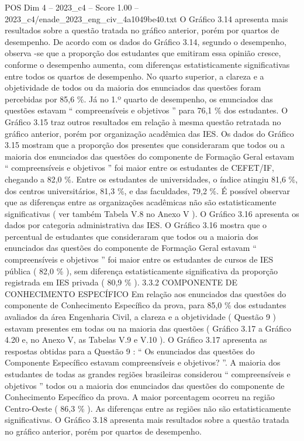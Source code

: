 \begin{textsample}{POS Dim 4 – 2023\_c4 – Score 1.00 – 2023\_c4/enade\_2023\_eng\_civ\_4a1049be40.txt}
O Gráfico 3.14 apresenta mais resultados sobre a questão tratada no gráfico anterior, porém por quartos de desempenho.
De acordo com os dados do Gráfico 3.14, segundo o desempenho, observa -se que a proporção dos estudantes que emitiram essa opinião cresce, conforme o desempenho aumenta, com diferenças estatisticamente significativas entre todos os quartos de desempenho.
No quarto superior, a clareza e a objetividade de todos ou da maioria dos enunciados das questões foram percebidas por 85,6 \%.
Já no 1.º quarto de desempenho, os enunciados das questões estavam “ compreensíveis e objetivos ” para 76,1 \% dos estudantes.
O Gráfico 3.15 traz outros resultados em relação à mesma questão retratada no gráfico anterior, porém por organização acadêmica das IES.
Os dados do Gráfico 3.15 mostram que a proporção dos presentes que consideraram que todos ou a maioria dos enunciados das questões do componente de Formação Geral estavam “ compreensíveis e objetivos ” foi maior entre os estudantes de CEFET/IF, chegando a 82,0 \%.
Entre os estudantes de universidades, o índice atingiu 81,6 \%, dos centros universitários, 81,3 \%, e das faculdades, 79,2 \%.
É possível observar que as diferenças entre as organizações acadêmicas não são estatisticamente significativas ( ver também Tabela V.8 no Anexo V ).
O Gráfico 3.16 apresenta os dados por categoria administrativa das IES.
O Gráfico 3.16 mostra que o percentual de estudantes que consideraram que todos ou a maioria dos enunciados das questões do componente de Formação Geral estavam “ compreensíveis e objetivos ” foi maior entre os estudantes de cursos de IES pública ( 82,0 \% ), sem diferença estatisticamente significativa da proporção registrada em IES privada ( 80,9 \% ). 3.3.2 COMPONENTE DE CONHECIMENTO ESPECÍFICO Em relação aos enunciados das questões do componente de Conhecimento Específico da prova, para 85,0 \% dos estudantes avaliados da área Engenharia Civil, a clareza e a objetividade ( Questão 9 ) estavam presentes em todas ou na maioria das questões ( Gráfico 3.17 a Gráfico 4.20 e, no Anexo V, as Tabelas V.9 e V.10 ).
O Gráfico 3.17 apresenta as respostas obtidas para a Questão 9 : “ Os enunciados das questões do Componente Específico estavam compreensíveis e objetivos? ”.
A maioria dos estudantes de todas as grandes regiões brasileiras considerou “ compreensíveis e objetivos ” todos ou a maioria dos enunciados das questões do componente de Conhecimento Específico da prova.
A maior porcentagem ocorreu na região Centro-Oeste ( 86,3 \% ).
As diferenças entre as regiões não são estatisticamente significativas.
O Gráfico 3.18 apresenta mais resultados sobre a questão tratada no gráfico anterior, porém por quartos de desempenho.

\end{textsample}
